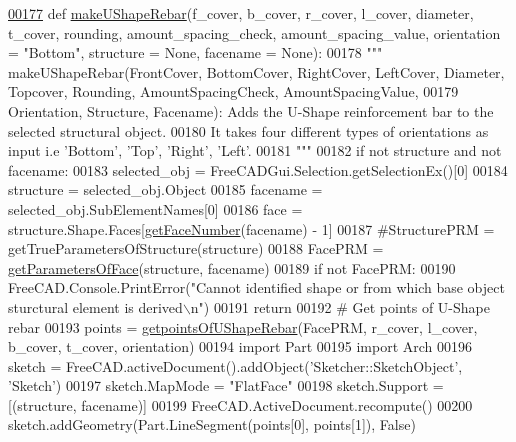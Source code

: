 \begin{DoxyCode}
\hypertarget{namespaceUShapeRebar.tex_l00177}{}\hyperlink{namespaceUShapeRebar_adb9f6e4b9ec41d7a1fdfe58ad174fec3}{00177} \textcolor{keyword}{def }\hyperlink{namespaceUShapeRebar_adb9f6e4b9ec41d7a1fdfe58ad174fec3}{makeUShapeRebar}(f\_cover, b\_cover, r\_cover, l\_cover, diameter, t\_cover, rounding, 
      amount\_spacing\_check, amount\_spacing\_value, orientation = "Bottom", structure = None, facename = None):
00178     \textcolor{stringliteral}{""" makeUShapeRebar(FrontCover, BottomCover, RightCover, LeftCover, Diameter, Topcover, Rounding,
       AmountSpacingCheck, AmountSpacingValue,}
00179 \textcolor{stringliteral}{    Orientation, Structure, Facename): Adds the U-Shape reinforcement bar to the selected structural
       object.}
00180 \textcolor{stringliteral}{    It takes four different types of orientations as input i.e 'Bottom', 'Top', 'Right', 'Left'.}
00181 \textcolor{stringliteral}{    """}
00182     \textcolor{keywordflow}{if} \textcolor{keywordflow}{not} structure \textcolor{keywordflow}{and} \textcolor{keywordflow}{not} facename:
00183         selected\_obj = FreeCADGui.Selection.getSelectionEx()[0]
00184         structure = selected\_obj.Object
00185         facename = selected\_obj.SubElementNames[0]
00186     face = structure.Shape.Faces[\hyperlink{namespaceRebarfunc_a3885b3b63e3a41508ac79bc7550cf301}{getFaceNumber}(facename) - 1]
00187     \textcolor{comment}{#StructurePRM = getTrueParametersOfStructure(structure)}
00188     FacePRM = \hyperlink{namespaceRebarfunc_a92122b3d7cedd3d47bb63380a5ac4d08}{getParametersOfFace}(structure, facename)
00189     \textcolor{keywordflow}{if} \textcolor{keywordflow}{not} FacePRM:
00190         FreeCAD.Console.PrintError(\textcolor{stringliteral}{"Cannot identified shape or from which base object sturctural element is
       derived\(\backslash\)n"})
00191         \textcolor{keywordflow}{return}
00192     \textcolor{comment}{# Get points of U-Shape rebar}
00193     points = \hyperlink{namespaceUShapeRebar_ac12ae9bce6b5211759f2fff4091b0221}{getpointsOfUShapeRebar}(FacePRM, r\_cover, l\_cover, b\_cover, t\_cover, 
      orientation)
00194     \textcolor{keyword}{import} Part
00195     \textcolor{keyword}{import} Arch
00196     sketch = FreeCAD.activeDocument().addObject(\textcolor{stringliteral}{'Sketcher::SketchObject'}, \textcolor{stringliteral}{'Sketch'})
00197     sketch.MapMode = \textcolor{stringliteral}{"FlatFace"}
00198     sketch.Support = [(structure, facename)]
00199     FreeCAD.ActiveDocument.recompute()
00200     sketch.addGeometry(Part.LineSegment(points[0], points[1]), \textcolor{keyword}{False})

\end{DoxyCode}

